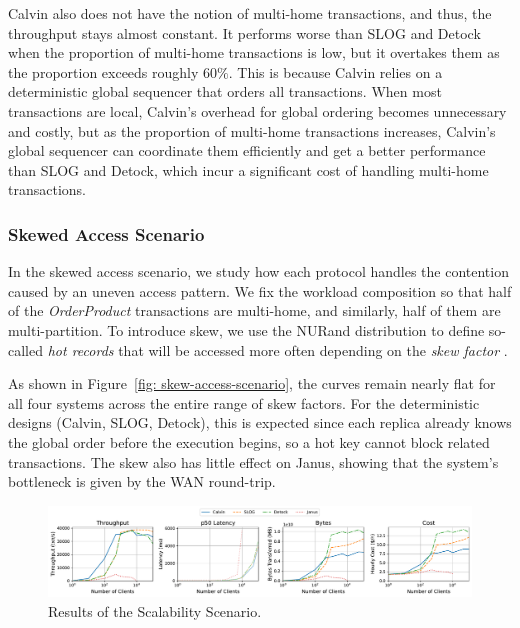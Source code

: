 \documentclass{article}
\begin{document}
Calvin also does not have the notion of multi-home transactions, and thus, the throughput stays almost constant. It performs worse than SLOG and Detock when the proportion of multi-home transactions is low, but it overtakes them as the proportion exceeds roughly $60\%$. This is because Calvin relies on a deterministic global sequencer that orders all transactions. When most transactions are local, Calvin's overhead for global ordering becomes unnecessary and costly, but as the proportion of multi-home transactions increases, Calvin's global sequencer can coordinate them efficiently and get a better performance than SLOG and Detock, which incur a significant cost of handling multi-home transactions.

\subsubsection{Skewed Access Scenario}
\label{subsubsec: skew-access-scenario}
In the skewed access scenario, we study how each protocol handles the contention caused by an uneven access pattern. We fix the workload composition so that half of the \textit{OrderProduct} transactions are multi-home, and similarly, half of them are multi-partition. To introduce skew, we use the NURand distribution to define so-called \textit{hot records} that will be accessed more often depending on the \textit{skew factor} \cite{council2010tpc}.

As shown in Figure~\ref{fig: skew-access-scenario}, the curves remain nearly flat for all four systems across the entire range of skew factors. For the deterministic designs (Calvin, SLOG, Detock), this is expected since each replica already knows the global order before the execution begins, so a hot key cannot block related transactions. The skew also has little effect on Janus, showing that the system's bottleneck is given by the WAN round-trip.

\begin{figure}[ht]
    \centering
    \includegraphics[width=1\textwidth]{figures/Scalability.pdf}
    \caption{Results of the Scalability Scenario.}
    \label{fig: scalability-access-scenario}
\end{figure}
\end{document}

